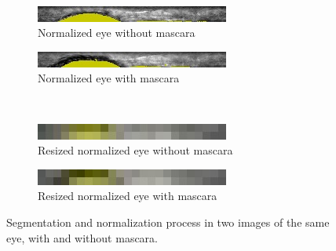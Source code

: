 \documentclass[10pt,twocolumn,letterpaper]{article}
\begin{document}
\begin{figure}[!ht]
    \\
    \begin{subfigure}[b]{0.49\linewidth}
        \centering
        \includegraphics[width=\textwidth]{img/bxgrid-863204-normalized_20x240.jpg}
        \caption{Normalized eye without mascara}
        \label{fig:eyesegwo}
    \end{subfigure}
    \hfill
    \begin{subfigure}[b]{0.49\linewidth}
        \centering
        \includegraphics[width=\textwidth]{img/bxgrid-822674-normalized_20x240.jpg}
        \caption{Normalized eye with mascara}
        \label{fig:eyesegwo}
    \end{subfigure}
    \\
    \begin{subfigure}[b]{0.49\linewidth}
        \centering
        \includegraphics[width=\textwidth]{img/bxgrid-863204-normalized_2x30.jpg}
        \caption{Resized normalized eye without mascara}
        \label{fig:eyesegwo}
    \end{subfigure}
    \hfill
    \begin{subfigure}[b]{0.49\linewidth}
        \centering
        \includegraphics[width=\textwidth]{img/bxgrid-822674-normalized_2x30.jpg}
        \caption{Resized normalized eye with mascara}
        \label{fig:eyesegwo}
    \end{subfigure}
    \caption{Segmentation and normalization process in two images of the same eye, with and without mascara.}
    \label{fig:eyemascara}
\end{figure}
\end{document}
